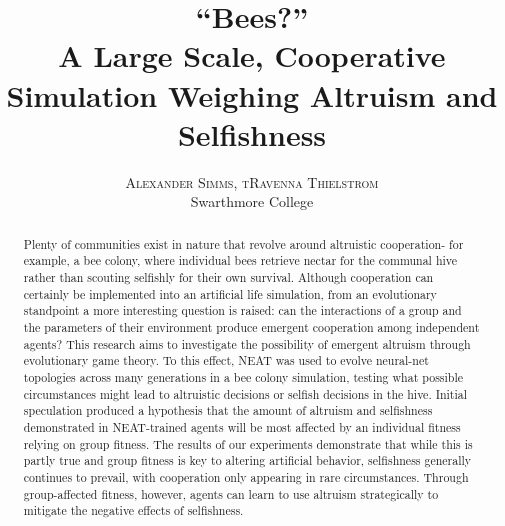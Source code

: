 \documentclass[twoside]{article}
\title{\vspace{-15mm}\fontsize{24pt}{10pt}\selectfont\textbf{``Bees?''\\\smallskip{} A Large Scale, Cooperative Simulation 
         Weighing Altruism and Selfishness}} %
\author{
\large
\textsc{Alexander Simms, tRavenna Thielstrom}\\[2mm] %
\normalsize Swarthmore College \\ %
\vspace{-5mm}
}
\date{}
\begin{document}
\maketitle %

\thispagestyle{fancy} %


\begin{abstract}

\noindent Plenty of communities exist in nature that revolve around altruistic cooperation- for example, a bee colony, where individual bees retrieve nectar for the communal hive rather than scouting selfishly for their own survival. Although cooperation can certainly be implemented into an artificial life simulation, from an evolutionary standpoint a more interesting question is raised: can the interactions of a group and the parameters of their environment produce emergent cooperation among independent agents? This research aims to investigate the possibility of emergent altruism through evolutionary game theory. To this effect, NEAT was used to evolve neural-net topologies across many generations in a bee colony simulation, testing what possible circumstances might lead to altruistic decisions or selfish decisions in the hive. Initial speculation produced a hypothesis that the amount of altruism and selfishness demonstrated in NEAT-trained agents will be most affected by an individual fitness relying on group fitness. The results of our experiments demonstrate that while this is partly true and group fitness is key to altering artificial behavior, selfishness generally continues to prevail, with cooperation only appearing in rare circumstances. Through group-affected fitness, however, agents can learn to use altruism strategically to mitigate the negative effects of selfishness.

\end{abstract}

\end{document}
